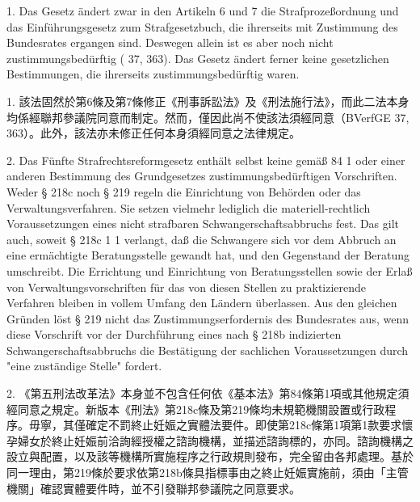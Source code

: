 \documentclass[12pt]{article}
\begin{document}
\syncleft
\begin{sourcepara}
1. Das Gesetz ändert zwar in den Artikeln 6 und 7 die Strafprozeßordnung und das Einführungsgesetz zum Strafgesetzbuch, die ihrerseits mit Zustimmung des Bundesrates ergangen sind. Deswegen allein ist es aber noch nicht zustimmungsbedürftig (\abbrBVerfGE{} 37, 363). Das Gesetz ändert ferner keine gesetzlichen Bestimmungen, die ihrerseits zustimmungsbedürftig waren.
\end{sourcepara}
\begin{transpara}
1. 該法固然於第6條及第7條修正《刑事訴訟法》及《刑法施行法》，而此二法本身均係經聯邦參議院同意而制定。然而，僅因此尚不使該法須經同意（BVerfGE 37, 363）。此外，該法亦未修正任何本身須經同意之法律規定。
\end{transpara}

\syncleft
\begin{sourcepara}
2. Das Fünfte Strafrechtsreformgesetz enthält selbst keine gemäß \abbrArt{} 84 \abbrAbs{} 1 oder einer anderen Bestimmung des Grundgesetzes zustimmungsbedürftigen Vorschriften. Weder § 218c noch § 219 \abbrStGB{} \abbrNF{} regeln die Einrichtung von Behörden oder das Verwaltungsverfahren. Sie setzen vielmehr lediglich die materiell-rechtlich Voraussetzungen eines nicht strafbaren Schwangerschaftsabbruchs fest. Das gilt auch, soweit § 218c \abbrAbs{} 1 \abbrNr{} 1 \abbrStGB{} verlangt, daß die Schwangere sich vor dem Abbruch an eine ermächtigte Beratungsstelle gewandt hat, und den Gegenstand der Beratung umschreibt. Die Errichtung und Einrichtung von Beratungsstellen sowie der Erlaß von Verwaltungsvorschriften für das von diesen Stellen zu praktizierende Verfahren bleiben in vollem Umfang den Ländern überlassen. Aus den gleichen Gründen löst § 219 \abbrStGB{} nicht das Zustimmungserfordernis des Bundesrates aus, wenn diese Vorschrift vor der Durchführung eines nach § 218b indizierten Schwangerschaftsabbruchs die Bestätigung der sachlichen Voraussetzungen durch "eine zuständige Stelle" fordert.
\end{sourcepara}
\begin{transpara}
2. 《第五刑法改革法》本身並不包含任何依《基本法》第84條第1項\ggfnArtEightFourOneZH{}或其他規定須經同意之規定。新版本《刑法》第218c條及第219條均未規範機關設置或行政程序。毋寧，其僅確定不罰終止妊娠之實體法要件。即使第218c條第1項第1款要求懷孕婦女於終止妊娠前洽詢經授權之諮詢機構，並描述諮詢標的，亦同。諮詢機構之設立與配置，以及該等機構所實施程序之行政規則發布，完全留由各邦處理。基於同一理由，第219條於要求依第218b條具指標事由之終止妊娠實施前，須由「主管機關」確認實體要件時，並不引發聯邦參議院之同意要求。
\end{transpara}
\end{document}
